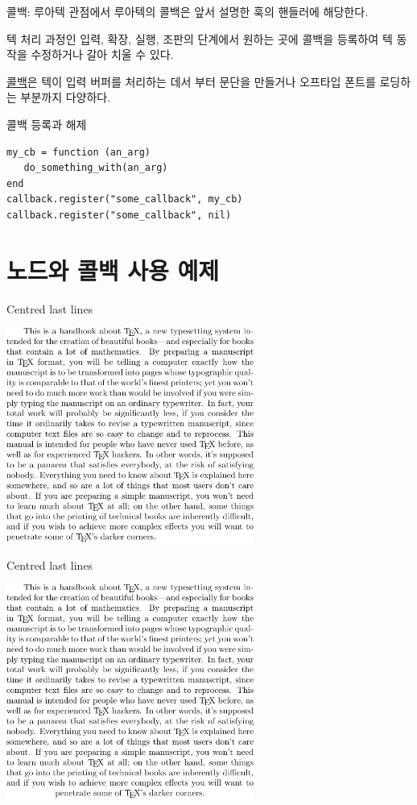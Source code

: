 \documentclass[t,10pt]{beamer}
\begin{document}
\begin{frame}[fragile]{콜백: 루아텍 관점에서}
  루아텍의 콜백은 앞서 설명한 훅의 핸들러에 해당한다.

  텍 처리 과정인 \alert{입력, 확장, 실행, 조판}의 단계에서 원하는
  곳에 콜백을 등록하여 텍 동작을 수정하거나 갈아 치울 수 있다.

  \alert{\href{http://wiki.luatex.org/index.php/Callbacks}{콜백}}은
  텍이 입력 버퍼를 처리하는 데서 부터 문단을 만들거나 오프타입 폰트를 로딩하는
  부분까지 다양하다.

  \medskip
  콜백 등록과 해제

  \begin{Verbatim}[fontsize=\small]
my_cb = function (an_arg)
   do_something_with(an_arg)
end
callback.register("some_callback", my_cb)
callback.register("some_callback", nil)
  \end{Verbatim}
\end{frame}

\section{노드와 콜백 사용 예제}

\begin{frame}{Centred last lines}
  \begin{center}
    \includegraphics[width=3.2in]{lcenter0.pdf}
  \end{center}
\end{frame}

\begin{frame}{Centred last lines}
  \begin{center}
    \includegraphics[width=3.2in]{lcenter.pdf}
  \end{center}
\end{frame}
\end{document}
